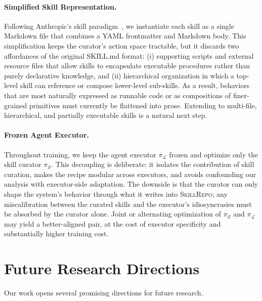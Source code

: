 \paragraph{Simplified Skill Representation.} Following Anthropic's skill paradigm~\citep{anthropic_skills_2025}, we instantiate each skill as a single Markdown file that combines a YAML frontmatter and Markdown body. This simplification keeps the curator's action space tractable, but it discards two affordances of the original SKILL.md format: (i) supporting scripts and external resource files that allow skills to encapsulate executable procedures rather than purely declarative knowledge, and (ii) hierarchical organization in which a top-level skill can reference or compose lower-level sub-skills. As a result, behaviors that are most naturally expressed as runnable code or as compositions of finer-grained primitives must currently be flattened into prose. Extending \ours{} to multi-file, hierarchical, and partially executable skills is a natural next step.

\paragraph{Frozen Agent Executor.} Throughout training, we keep the agent executor $\pi_{\mathcal{L}}$ frozen and optimize only the skill curator $\pi_{\mathcal{S}}$. This decoupling is deliberate: it isolates the contribution of skill curation, makes the recipe modular across executors, and avoids confounding our analysis with executor-side adaptation. The downside is that the curator can only shape the system's behavior through what it writes into \textsc{SkillRepo}; any miscalibration between the curated skills and the executor's idiosyncrasies must be absorbed by the curator alone. Joint or alternating optimization of $\pi_{\mathcal{S}}$ and $\pi_{\mathcal{L}}$ may yield a better-aligned pair, at the cost of executor specificity and substantially higher training cost.

\section{Future Research Directions}

Our work opens several promising directions for future research.

